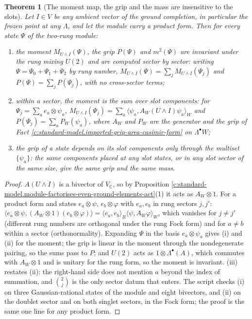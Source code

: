 \documentclass[11pt]{article}
\newtheorem{theorem}{Theorem}[section]
\theoremstyle{definition}
\theoremstyle{plain}
\providecommand{\C}{}\renewcommand{\C}{\mathbb{C}}
\providecommand{\ip}{}\renewcommand{\ip}[2]{\langle #1, #2\rangle}
\begin{document}
\begin{theorem}[The moment map, the grip and the mass are insensitive to the slots]\label{c:standard-model.moment-map-grip-mass-are-insensitive}
Let $I \in V$ be any ambient vector of the ground completion, in particular the frozen point at any $\Lambda$, and let the module carry a product form. Then for every state $\Psi$ of the two-rung module:
\begin{enumerate}
\item[(i)] the moment $M_{U \wedge I}(\Psi)$, the grip $P(\Psi)$ and $m^{2}(\Psi)$ are invariant under the rung mixing $U(2)$ and are computed sector by sector: writing $\Psi = \Psi_{0} + \Psi_{1} + \Psi_{2}$ by rung number, $M_{U \wedge I}(\Psi) = \sum_{j} M_{U \wedge I}(\Psi_{j})$ and $P(\Psi) = \sum_{j} P(\Psi_{j})$, with no cross-sector terms;
\item[(ii)] within a sector, the moment is the sum over slot components: for $\Psi_{j} = \sum_{a} e_{a} \otimes \psi_{a}$, $M_{U \wedge I}(\Psi_{j}) = \sum_{a} \ip{\psi_{a}}{A_{W}(U \wedge I)\psi_{a}}_{W}$ and $P(\Psi_{j}) = \sum_{a} P_{W}(\psi_{a})$, where $A_{W}$ and $P_{W}$ are the generator and the grip of Fact \ref{c:standard-model.imported-grip-area-casimir-form} on $\Lambda^{\bullet}W$;
\item[(iii)] the grip of a state depends on its slot components only through the multiset $\{\psi_{a}\}$: the same components placed at any slot states, or in any slot sector of the same size, give the same grip and the same mass.
\end{enumerate}
\end{theorem}
\begin{proof}
$A(U \wedge I)$ is a bivector of $V_{\C}$, so by Proposition \ref{c:standard-model.module-factorises-even-ground-elements-act}(1) it acts as $A_{W} \otimes 1$. For a product form and states $e_{a} \otimes \psi$, $e_{b} \otimes \varphi$ with $e_{a}, e_{b}$ in rung sectors $j, j'$: $\ip{e_{a} \otimes \psi}{(A_{W} \otimes 1)(e_{b} \otimes \varphi)} = \ip{e_{a}}{e_{b}}_{R}\ip{\psi}{A_{W}\varphi}_{W}$, which vanishes for $j \ne j'$ (different rung numbers are orthogonal under the rung Fock form) and for $a \ne b$ within a sector (orthonormality). Expanding $\Psi$ in the basis $e_{a} \otimes \psi_{a}$ gives (i) and (ii) for the moment; the grip is linear in the moment through the nondegenerate pairing, so the sums pass to $P$; and $U(2)$ acts as $1 \otimes \Lambda^{\bullet}(A)$, which commutes with $A_{W} \otimes 1$ and is unitary for the rung form, so the moment is invariant. (iii) restates (ii): the right-hand side does not mention $a$ beyond the index of summation, and $\binom{2}{j}$ is the only sector datum that enters. The script checks (i) on three Gaussian-rational states of the module and eight bivectors, and (ii) on the doublet sector and on both singlet sectors, in the Fock form; the proof is the same one line for any product form.

\end{proof}
\end{document}

